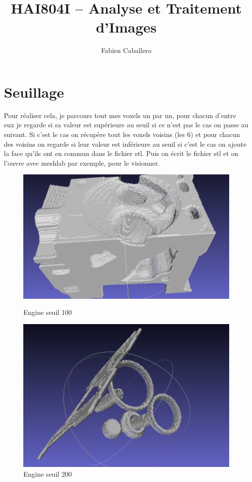 \documentclass{article}
\title{HAI804I – Analyse et Traitement d'Images}
\author{Fabien Caballero }
\begin{document}
  

\maketitle
    \tableofcontents

\newpage

\section{Seuillage}
Pour réaliser cela, je parcours tout mes voxels un par un, pour chacun d'entre eux je regarde si sa valeur est supérieure au seuil si ce n'est pas le cas on passe au suivant. Si c'est le cas on récupère tout les voxels voisins (les 6) et pour chacun des voisins on regarde si leur valeur est inférieure au seuil si c'est le cas on ajoute la face qu'ils ont en commun dans le fichier stl.
Puis on écrit le fichier stl et on l'ouvre avec meshlab par exemple, pour le visionner. 

\begin{figure}[h]
\centerline{\includegraphics[scale=0.38]{./100.png}}
\caption{Engine seuil 100}

\centerline{\includegraphics[scale=0.38]{./200.png}}
\caption{Engine seuil 200}
\end{figure}
\end{document}
